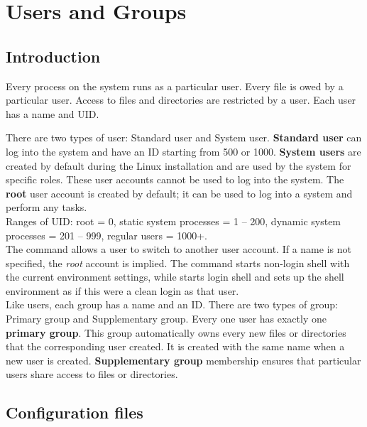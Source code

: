 \chapter{Users and Groups}

\section{Introduction}

Every process on the system runs as a particular user. Every file is owed by a particular user. Access to files and directories are restricted by a user. Each user has a name and UID. 

There are two types of user: Standard user and System user. \textbf{Standard user} can log into the system and have an ID starting from 500 or 1000. \textbf{System users} are created by default during the Linux installation and are used by the system for specific roles. These user accounts cannot be used to log into the system. The \textbf{root} user account is created by default; it can be used to log into a system and perform any tasks.\\

Ranges of UID: root = 0, static system processes = 1 -- 200, dynamic system processes = 201 -- 999, regular users = 1000+.\\

The  command allows a user to switch to another user account. If a name is not specified, the \emph{root} account is implied. The command  starts non-login shell with the current environment settings, while  starts login shell and sets up the shell environment as if this were a clean login as that user.\\



Like users, each group has a name and an ID. There are two types of group: Primary group and Supplementary group. Every one user has exactly one \textbf{primary group}. This group automatically owns every new files or directories that the corresponding user created. It is  created with the same name when a new user is created. \textbf{Supplementary group} membership ensures that particular users share access to files or directories. 

\section{Configuration files}

